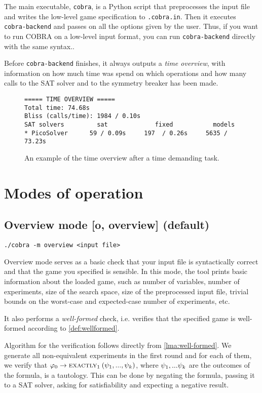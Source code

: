 The main executable, \texttt{cobra}, is a Python script that preprocesses
  the input file and writes the low-level game specification to \texttt{.cobra.in}.
Then it executes \texttt{cobra-backend} and passes on all the options given
  by the user.
Thus, if you want to run COBRA on a low-level input format, you can run
  \texttt{cobra-backend} directly with the same syntax..

Before \texttt{cobra-backend} finishes, it always outputs a \emph{time overview},
  with information on how much time was spend on which operations and
  how many calls to the SAT solver and to the symmetry breaker has been made.

\begin{figure}[h]
\begin{lstlisting}
===== TIME OVERVIEW =====
Total time: 74.68s
Bliss (calls/time): 1984 / 0.10s
SAT solvers         sat             fixed           models
* PicoSolver      59 / 0.09s     197  / 0.26s     5635 / 73.23s
\end{lstlisting}
\caption{An example of the time overview after a time demanding task.}
\label{fig:timeoverview}
\end{figure}


\section{Modes of operation}\label{s:cobra-modes}

\subsection{Overview mode [o, overview] (default)}

\centerline{\texttt{./cobra -m overview <input file> }}
\medskip

Overview mode serves as a basic check that your input file is
  syntactically correct and that the game you specified is sensible.
In this mode, the tool prints basic information about the loaded game, such as
  number of variables, number of experiments, size of the search space,
  size of the preprocessed input file,
  trivial bounds on the worst-case and expected-case number of experiments, etc.

It also performs a \emph{well-formed} check, i.e. verifies that the
  specified game is well-formed according to \autoref{def:wellformed}.

Algorithm for the verification follows directly from \autoref{lma:well-formed}.
We generate all non-equivalent experiments in the first round
  and for each of them, we verify that
  $\varphi_0->\textsc{exactly}_{1}\:(\psi_1, ..., \psi_k)$,
  where $\psi_1,...\psi_k$ are the outcomes of the formula,
  is a tautology.
This can be done by negating the formula,
  passing it to a SAT solver, asking for satisfiability
  and expecting a negative result.

